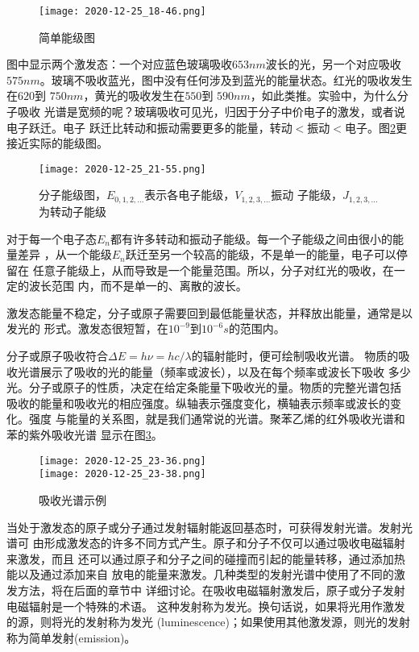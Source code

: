 \begin{figure}[htpb]
    \centering
    \texttt{[image: 2020-12-25\_18-46.png]}
    \caption{简单能级图}
    \label{fig:EnergyDia}
\end{figure}

图中显示两个激发态：一个对应蓝色玻璃吸收$653 nm$波长的光，另一个对应吸收$575 
nm$。玻璃不吸收蓝光，图中没有任何涉及到蓝光的能量状态。红光的吸收发生在$620$到
$750 nm$，黄光的吸收发生在$550$到 $590 nm$，如此类推。实验中，为什么分子吸收
光谱是宽频的呢？玻璃吸收可见光，归因于分子中价电子的激发，或者说电子跃迁。电子
跃迁比转动和振动需要更多的能量，转动$<$振动$<$电子。图\ref{fig:EnergyDia2}更
接近实际的能级图。
\begin{figure}[htpb]
    \centering
    \texttt{[image: 2020-12-25\_21-55.png]}
    \caption{分子能级图，$E_{0,1,2,\dots}$表示各电子能级，$V_{1,2,3,\dots}$振动
    子能级，$J_{1,2,3,\dots}$为转动子能级}
    \label{fig:EnergyDia2}
\end{figure}
对于每一个电子态$E_n$都有许多转动和振动子能级。每一个子能级之间由很小的能量差异
，从一个能级$E_n$跃迁至另一个较高的能级，不是单一的能量，电子可以停留在
任意子能级上，从而导致是一个能量范围。所以，分子对红光的吸收，在一定的波长范围
内，而不是单一的、离散的波长。

激发态能量不稳定，分子或原子需要回到最低能量状态，并释放出能量，通常是以发光的
形式。激发态很短暂，在$10^{-9}$到$10^{-6} s$的范围内。

分子或原子吸收符合$\Delta E = h\nu = hc/\lambda$的辐射能时，便可绘制吸收光谱。
物质的吸收光谱展示了吸收的光的能量（频率或波长），以及在每个频率或波长下吸收
多少光。分子或原子的性质，决定在给定条能量下吸收光的量。物质的完整光谱包括
吸收的能量和吸收光的相应强度。纵轴表示强度变化，横轴表示频率或波长的变化。强度
与能量的关系图，就是我们通常说的光谱。聚苯乙烯的红外吸收光谱和苯的紫外吸收光谱
显示在图\ref{fig:example1}。
\begin{figure}[htpb]
    \centering
    \texttt{[image: 2020-12-25\_23-36.png]}\\
    \texttt{[image: 2020-12-25\_23-38.png]}
    \caption{吸收光谱示例}
    \label{fig:example1}
\end{figure}

当处于激发态的原子或分子通过发射辐射能返回基态时，可获得发射光谱。发射光谱可
由形成激发态的许多不同方式产生。原子和分子不仅可以通过吸收电磁辐射来激发，而且
还可以通过原子和分子之间的碰撞而引起的能量转移，通过添加热能以及通过添加来自
放电的能量来激发。几种类型的发射光谱中使用了不同的激发方法，将在后面的章节中
详细讨论。在吸收电磁辐射激发后，原子或分子发射电磁辐射是一个特殊的术语。
这种发射称为发光。换句话说，如果将光用作激发的源，则将光的发射称为发光
(luminescence)；如果使用其他激发源，则光的发射称为简单发射(emission)。

